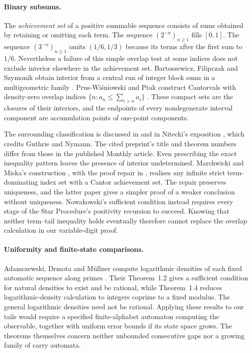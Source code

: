 \paragraph{Binary subsums.}
The \emph{achievement set} of a positive summable sequence consists of
sums obtained by retaining or omitting each term.  The sequence
$(2^{-n})_{n\ge1}$ fills $[0,1]$.  The sequence $(3^{-n})_{n\ge1}$
omits $(1/6,1/3)$ because its terms after the first sum to $1/6$.
Nevertheless a failure of this simple overlap test at some indices does
not exclude interior elsewhere in the achievement set.
Bartoszewicz, Filipczak and Szymonik obtain interior from a central run
of integer block sums in a multigeometric family
\cite[Theorem~2]{bartoszewicz2014}.
Prus-Wi\'sniowski and Ptak construct Cantorvals with density-zero overlap
indices $\{n:a_n\le\sum_{i>n}a_i\}$ \cite[Theorem]{prusptak2024}.
These compact sets are the closures of their interiors, and the endpoints
of every nondegenerate interval component are accumulation points of
one-point components.

The surrounding classification is discussed in \cite[\S1]{glabprus2025}
and in Nitecki's exposition \cite[Theorem~14]{nitecki2015}, which credits
Guthrie and Nymann.  The cited preprint's title and theorem numbers differ
from those in the published Monthly article.
Even prescribing the exact inequality pattern leaves the presence of
interior undetermined.  Marchwicki and Miska's construction
\cite[Theorem~2.1]{marchwickimiska2021}, with the proof repair in
\cite{miskaprusptak2023}, realises any infinite strict term-dominating
index set with a Cantor achievement set.  The repair preserves uniqueness,
and the latter paper gives a simpler proof of a weaker conclusion without
uniqueness.  Nowakowski's sufficient condition
\cite[Definition~2, Theorem~3.1]{nowakowski2025} instead requires every
stage of the Star Procedure's positivity recursion to succeed.
Knowing that neither term--tail inequality holds eventually therefore
cannot replace the overlap calculation in our variable-digit proof.

\paragraph{Uniformity and finite-state comparisons.}
Adamczewski, Drmota and M\"ullner compute logarithmic densities of each
fixed automatic sequence along primes \cite[Theorems~1.2, 1.4]{adm2022}.
Their Theorem~1.2 gives a sufficient condition for natural densities to
exist and be rational, while Theorem~1.4 reduces logarithmic-density
calculation to integers coprime to a fixed modulus.  The general
logarithmic densities need not be rational.  Applying these results to
our tails would require a specified finite-alphabet automaton computing
the observable, together with uniform error bounds if its state space
grows.  The theorems themselves concern neither unbounded consecutive
gaps nor a growing family of carry automata.

